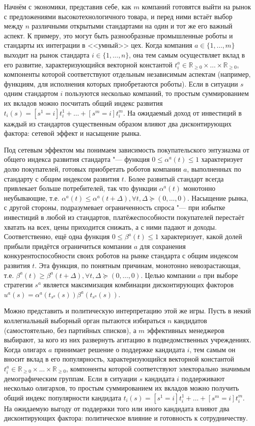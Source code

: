 Начнём с экономики, представив себе, как $m$ компаний готовятся выйти на рынок с предложениями высокотехнологичного товара, и перед ними встаёт выбор между $n$ различными открытыми стандартами на один и тот же его важный аспект. К примеру, это могут быть разнообразные промышленные роботы и стандарты их интеграции в <<умный>> цех. Когда компания $a \in \{1, \ldots, m\}$ выходит на рынок стандарта $i \in \{1, \ldots, n\}$, она тем самым осуществляет вклад в его развитие, характеризующийся векторной константой $t_i^a \in \mathbb{R}_{\ge 0} \times \ldots \times \mathbb{R}_{\ge 0}$, компоненты которой соответствуют отдельным независимым аспектам (например, функциям, для исполнения которых приобретаются роботы). Если в ситуации $s$ одним стандартом $i$ пользуются несколько компаний, то простым суммированием их вкладов можно посчитать общий индекс развития $t_i(s) = [s^1 = i] t_i^1 + \ldots + [s^m = i] t_i^m$. На ожидаемый доход от инвестиций в каждый из стандартов существенным образом влияют два дисконтирующих фактора: сетевой эффект и насыщение рынка.

Под сетевым эффектом мы понимаем зависимость покупательского энтузиазма от общего индекса развития стандарта "--- функция $0 \le \alpha^a(t) \le 1$ характеризует долю покупателей, готовых приобретать роботов компании $a$, выполненных по стандарту с общим индексом развития $t$. Более развитый стандарт всегда привлекает больше потребителей, так что функции $\alpha^a(t)$ монотонно неубывающие, т.е. $\alpha^a(t) \le \alpha^a(t + \Delta), \forall t, \Delta \succeq (0, \ldots, 0)$. Насыщение рынка, с другой стороны, подразумевает ограниченность спроса "--- при избытке инвестиций в любой из стандартов, платёжеспособности покупателей перестаёт хватать на всех, цены приходится снижать, а с ними падают и доходы. Соответственно, ещё одна функция $0 \le \beta^a(t) \le 1$ характеризует, какой долей прибыли придётся ограничиться компании $a$ для сохранения конкурентоспособности своих роботов на рынке стандарта с общим индексом развития $t$. Эта функция, по понятным причинам, монотонно невозрастающая, т.е. $\beta^a(t) \ge \beta^a(t + \Delta), \forall t, \Delta \succeq (0, \ldots, 0)$. Целью компании $a$ при выборе стратегии $s^a$ является максимизация комбинации дисконтирующих факторов $u^a(s) = \alpha^a(t_{s^a}(s)) \beta^a(t_{s^a}(s))$.

Можно представить и политическую интерпретацию этой же игры. Пусть в некий коллегиальный выборный орган пытаются избираться $n$ кандидатов (самостоятельно, без партийных списков), а $m$ эффективных менеджеров выбирают, за кого из них развернуть агитацию в подведомственных учреждениях. Когда олигарх $a$ принимает решение о поддержке кандидата $i$, тем самым он вносит вклад в его популярность, характеризующийся векторной константой $t_i^a \in \mathbb{R}_{\ge 0} \times \ldots \times \mathbb{R}_{\ge 0}$, компоненты которой соответствуют электорально значимым демографическим группам. Если в ситуации $s$ кандидата $i$ поддерживают несколько олигархов, то простым суммированием их вкладов можно получить общий индекс популярности кандидата $t_i(s) = [s^1 = i] t_i^1 + \ldots + [s^m = i] t_i^m$. На ожидаемую выгоду от поддержки того или иного кандидата влияют два дисконтирующих фактора: политическое влияние и готовность к сотрудничеству.

